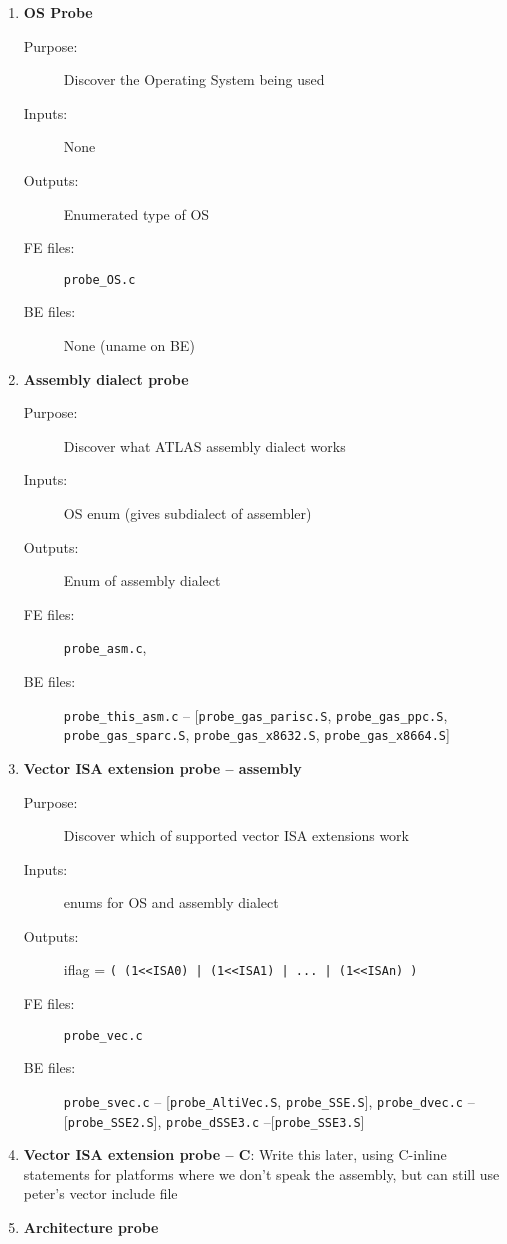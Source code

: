 \documentclass[11pt]{article}
\begin{document}
\begin{enumerate}
\item {\bf OS Probe}
   \begin{description}
   \item [Purpose:] Discover the Operating System being used
   \item [Inputs:]  None
   \item [Outputs:] Enumerated type of OS
   \item [FE files:] {\tt probe\_OS.c}
   \item [BE files:] None (uname on BE)
   \end{description}
\item {\bf Assembly dialect probe}
   \begin{description}
   \item [Purpose:] Discover what ATLAS assembly dialect works
   \item [Inputs:]  OS enum (gives subdialect of assembler)
   \item [Outputs:] Enum of assembly dialect
   \item [FE files:] {\tt probe\_asm.c}, 
   \item [BE files:] {\tt probe\_this\_asm.c} -- [{\tt probe\_gas\_parisc.S}, 
         {\tt probe\_gas\_ppc.S}, {\tt probe\_gas\_sparc.S}, 
         {\tt probe\_gas\_x8632.S}, {\tt probe\_gas\_x8664.S}]
   \end{description}
\item {\bf Vector ISA extension probe -- assembly}
   \begin{description}
   \item [Purpose:] Discover which of supported vector ISA extensions work
   \item [Inputs:]  enums for OS and assembly dialect
   \item [Outputs:] iflag = \verb+( (1<<ISA0) | (1<<ISA1) | ... | (1<<ISAn) )+
   \item [FE files:] {\tt probe\_vec.c} 
   \item [BE files:] {\tt probe\_svec.c} --
                  [{\tt probe\_AltiVec.S}, {\tt probe\_SSE.S}],
                  {\tt probe\_dvec.c} -- [{\tt probe\_SSE2.S}],
                  {\tt probe\_dSSE3.c} --[{\tt probe\_SSE3.S}]
   \end{description}
\item {\bf Vector ISA extension probe -- C}: Write this later, using C-inline
      statements for platforms where we don't speak the assembly, but can still
      use peter's vector include file
\item {\bf Architecture probe}

\end{enumerate}
\end{document}

